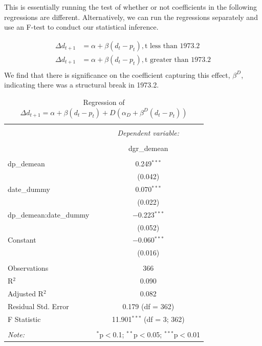 \documentclass[11pt,letter]{article}
\begin{document}
This is essentially running the test of whether or not coefficients in the following regressions are different. Alternatively, we can run the regressions separately and use an F-test to conduct our statistical inference. 

\begin{equation*}
\begin{split}
 \Delta d_{t+1} &= \alpha + \beta (d_t - p_t) , \text{t less than 1973.2}\\
  \Delta d_{t+1} &= \alpha + \beta (d_t - p_t), \text{t  greater than 1973.2} \\
\end{split}
\end{equation*}
We find that there is significance on the coefficient capturing this effect, $\beta^D$,  indicating there was a structural break in 1973.2.
\begin{table}[!htbp] \centering 
	\caption{Regression of $\Delta d_{t+1} = \alpha + \beta (d_t - p_t) + D (\alpha_D + \beta^D (d_t - p_t))$}
	\label{table:regressions_structural_break} 
	\begin{tabular}{@{\extracolsep{5pt}}lc} 
		\\[-1.8ex]\hline 
		\hline \\[-1.8ex] 
		& \multicolumn{1}{c}{\textit{Dependent variable:}} \\ 
		\cline{2-2} 
		\\[-1.8ex] & dgr\_demean \\ 
		\hline \\[-1.8ex] 
		dp\_demean & 0.249$^{***}$ \\ 
		& (0.042) \\ 
		date\_dummy & 0.070$^{***}$ \\ 
		& (0.022) \\ 
		dp\_demean:date\_dummy & $-$0.223$^{***}$ \\ 
		& (0.052) \\ 
		Constant & $-$0.060$^{***}$ \\ 
		& (0.016) \\ 
		\hline \\[-1.8ex] 
		Observations & 366 \\ 
		R$^{2}$ & 0.090 \\ 
		Adjusted R$^{2}$ & 0.082 \\ 
		Residual Std. Error & 0.179 (df = 362) \\ 
		F Statistic & 11.901$^{***}$ (df = 3; 362) \\ 
		\hline 
		\hline \\[-1.8ex] 
		\textit{Note:}  & \multicolumn{1}{r}{$^{*}$p$<$0.1; $^{**}$p$<$0.05; $^{***}$p$<$0.01} \\ 
	\end{tabular} 
\end{table} 
\quad
\quad 
\quad
\newpage
\end{document}
